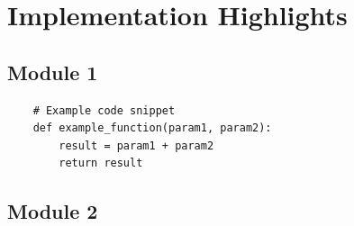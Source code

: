 \section{Implementation Highlights}

\lipsum[1]

\subsection{Module 1}

\lipsum[2]

\begin{listing}[H]
	\begin{verbatim}
	# Example code snippet
	def example_function(param1, param2):
		result = param1 + param2
		return result
	\end{verbatim}
	\caption{Key implementation snippet.}
	\label{lst:example}
\end{listing}

\subsection{Module 2}

\lipsum[3]
